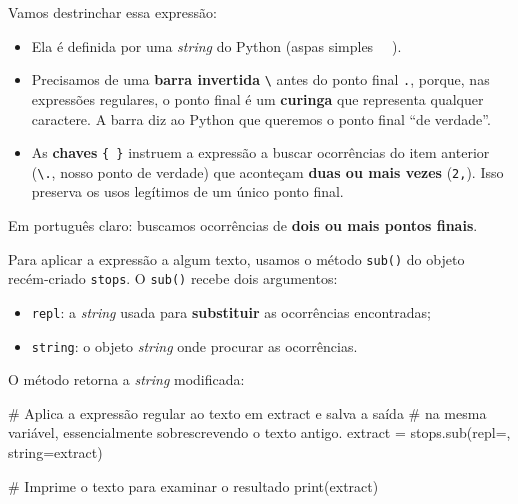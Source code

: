 \documentclass[
  brazilian,
  11pt,
]{article}
\newenvironment{Shaded}{\begin{snugshade}}{\end{snugshade}}
\newcommand{\BuiltInTok}[1]{\textcolor[rgb]{0.50,0.55,0.55}{#1}}
\newcommand{\CommentTok}[1]{\textcolor[rgb]{0.48,0.49,0.49}{#1}}
\newcommand{\NormalTok}[1]{\textcolor[rgb]{0.81,0.81,0.76}{#1}}
\newcommand{\OperatorTok}[1]{\textcolor[rgb]{0.81,0.81,0.76}{#1}}
\newcommand{\StringTok}[1]{\textcolor[rgb]{0.96,0.31,0.31}{#1}}
\providecommand{\tightlist}{%
  \setlength{\itemsep}{0pt}\setlength{\parskip}{0pt}}
\let\oldtexttt\texttt
\renewcommand{\texttt}[1]{{\color{inlink}\oldtexttt{#1}}}
\begin{document}
Vamos destrinchar essa expressão:

\begin{itemize}
\tightlist
\item
  Ela é definida por uma \emph{string} do Python (aspas simples
  \texttt{\textquotesingle{}\ \ \textquotesingle{}}).
\item
  Precisamos de uma \textbf{barra invertida} \texttt{\textbackslash{}}
  antes do ponto final \texttt{.}, porque, nas expressões regulares, o
  ponto final é um \textbf{curinga} que representa qualquer caractere. A
  barra diz ao Python que queremos o ponto final ``de verdade''.
\item
  As \textbf{chaves} \texttt{\{\ \}} instruem a expressão a buscar
  ocorrências do item anterior (\texttt{\textbackslash{}.}, nosso ponto
  de verdade) que aconteçam \textbf{duas ou mais vezes} (\texttt{2,}).
  Isso preserva os usos legítimos de um único ponto final.
\end{itemize}

Em português claro: buscamos ocorrências de \textbf{dois ou mais pontos
finais}.

Para aplicar a expressão a algum texto, usamos o método \texttt{sub()}
do objeto recém‑criado \texttt{stops}. O \texttt{sub()} recebe dois
argumentos:

\begin{itemize}
\tightlist
\item
  \texttt{repl}: a \emph{string} usada para \textbf{substituir} as
  ocorrências encontradas;
\item
  \texttt{string}: o objeto \emph{string} onde procurar as ocorrências.
\end{itemize}

O método retorna a \emph{string} modificada:

\begin{Shaded}
\begin{Highlighting}[]
\CommentTok{\# Aplica a expressão regular ao texto em \textquotesingle{}extract\textquotesingle{} e salva a saída}
\CommentTok{\# na mesma variável, essencialmente sobrescrevendo o texto antigo.}
\NormalTok{extract }\OperatorTok{=}\NormalTok{ stops.sub(repl}\OperatorTok{=}\StringTok{\textquotesingle{}\textquotesingle{}}\NormalTok{, string}\OperatorTok{=}\NormalTok{extract)}

\CommentTok{\# Imprime o texto para examinar o resultado}
\BuiltInTok{print}\NormalTok{(extract)}
\end{Highlighting}
\end{Shaded}
\end{document}
